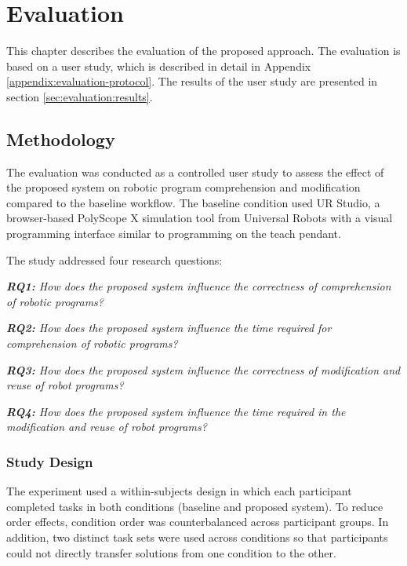 \chapter{Evaluation} \label{chapter:evaluation}
This chapter describes the evaluation of the proposed approach. The evaluation is based on a user study, which is described in detail in Appendix \ref{appendix:evaluation-protocol}. The results of the user study are presented in section \ref{sec:evaluation:results}.

\section{Methodology} \label{sec:evaluation:methodology}
The evaluation was conducted as a controlled user study to assess the effect of the proposed system on robotic program comprehension and modification compared to the baseline workflow. The baseline condition used UR Studio, a browser-based PolyScope X simulation tool from Universal Robots with a visual programming interface similar to programming on the teach pendant.

The study addressed four research questions:
\begin{adjustwidth}{\indentWidthTwenty}{\indentWidthTwenty}
    \textit{\textbf{RQ1:} How does the proposed system influence the correctness of comprehension of robotic programs?}
\end{adjustwidth}
\begin{adjustwidth}{\indentWidthTwenty}{\indentWidthTwenty}
    \textit{\textbf{RQ2:} How does the proposed system influence the time required for comprehension of robotic programs?}
\end{adjustwidth}
\begin{adjustwidth}{\indentWidthTwenty}{\indentWidthTwenty}
    \textit{\textbf{RQ3:} How does the proposed system influence the correctness of modification and reuse of robot programs?}
\end{adjustwidth}
\begin{adjustwidth}{\indentWidthTwenty}{\indentWidthTwenty}
    \textit{\textbf{RQ4:} How does the proposed system influence the time required in the modification and reuse of robot programs?}
\end{adjustwidth}

\subsection{Study Design}
The experiment used a within-subjects design in which each participant completed tasks in both conditions (baseline and proposed system). To reduce order effects, condition order was counterbalanced across participant groups. In addition, two distinct task sets were used across conditions so that participants could not directly transfer solutions from one condition to the other.

